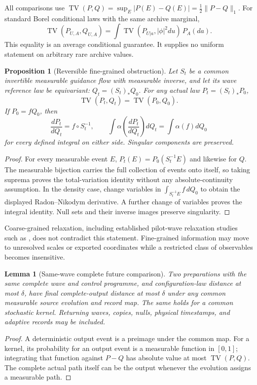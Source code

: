 \documentclass[11pt,oneside,openany]{book}
\newtheorem{lemma}[theorem]{Lemma}
\newtheorem{proposition}[theorem]{Proposition}
\theoremstyle{definition}
\theoremstyle{remark}\newtheorem{remark}[theorem]{Remark}
\begin{document}
All comparisons use
$\operatorname{TV}(P,Q)=\sup_E|P(E)-Q(E)|=\frac12\|P-Q\|_1$.
For standard Borel conditional laws with the same archive marginal,
\begin{equation}
 \operatorname{TV}(P_{U,A},Q_{U,A})
 =\int\operatorname{TV}(P_{U|a},|\phi|^2du)\,P_A(da).
 \label{prep:averageconditional}
\end{equation}
This equality is an average conditional guarantee. It supplies no uniform
statement on arbitrary rare archive values.

\begin{proposition}[Reversible fine-grained obstruction]
\label{prep:reversible}
Let $S_t$ be a common invertible measurable guidance flow with measurable
inverse, and let its wave reference law be equivariant:
$Q_t=(S_t)_*Q_0$. For any actual law $P_t=(S_t)_*P_0$,
\[
 \operatorname{TV}(P_t,Q_t)=\operatorname{TV}(P_0,Q_0).
\]
If $P_0=fQ_0$, then
\[
 \frac{dP_t}{dQ_t}=f\circ S_t^{-1},\qquad
 \int\alpha\!\left(\frac{dP_t}{dQ_t}\right)dQ_t
      =\int\alpha(f)dQ_0
\]
for every defined integral on either side. Singular components are preserved.
\end{proposition}
\begin{proof}
For every measurable event $E$,
$P_t(E)=P_0(S_t^{-1}E)$ and likewise for $Q$.
The measurable bijection carries the full collection of events onto itself,
so taking suprema proves the total-variation identity without any
absolute-continuity assumption. In the density case, change variables in
$\int_{S_t^{-1}E}f\,dQ_0$ to obtain the displayed Radon--Nikodym derivative.
A further change of variables proves the integral identity. Null sets and
their inverse images preserve singularity.
\end{proof}

Coarse-grained relaxation, including established pilot-wave relaxation
studies such as \cite{ValentiniWestman}, does not contradict this statement.
Fine-grained information may move to unresolved scales or exported
coordinates while a restricted class of observables becomes insensitive.

\begin{lemma}[Same-wave complete future comparison]\label{prep:push}
Two preparations with the same complete wave and control programme,
and configuration-law distance at most $\delta$, have final
complete-output distance at most $\delta$ under any common measurable
source evolution and record map. The same holds for a common stochastic
kernel. Returning waves, copies, nulls, physical timestamps, and
adaptive records may be included.
\end{lemma}
\begin{proof}
A deterministic output event is a preimage under the common map.
For a kernel, its probability for an output event is a measurable function
in $[0,1]$; integrating that function against $P-Q$ has absolute value at
most $\operatorname{TV}(P,Q)$. The complete actual path itself can be the
output whenever the evolution assigns a measurable path.
\end{proof}
\end{document}
